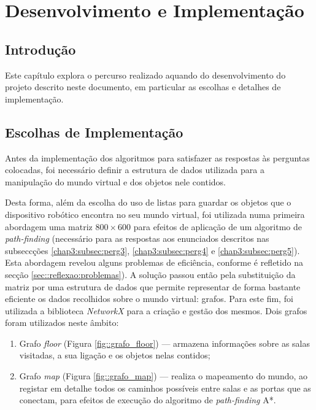 \chapter{Desenvolvimento e Implementação}
\label{ch::implement}

\section{Introdução}
\label{sec::implement:intro}

Este capítulo explora o percurso realizado aquando do desenvolvimento do projeto descrito neste documento, em particular as escolhas e detalhes de implementação.


\section{Escolhas de Implementação}
\label{sec::implement:struct}

Antes da implementação dos algoritmos para satisfazer as respostas às perguntas colocadas, foi necessário definir a estrutura de dados utilizada para a manipulação do mundo virtual e dos objetos nele contidos.

Desta forma, além da escolha do uso de listas para guardar os objetos que o dispositivo robótico encontra no seu mundo virtual, foi utilizada numa primeira abordagem uma matriz $800\times600$ para efeitos de aplicação de um algoritmo de \textit{path-finding} (necessário para as respostas aos enunciados descritos nas subseccções \ref{chap3:subsec:perg3}, \ref{chap3:subsec:perg4} e \ref{chap3:subsec:perg5}). Esta abordagem revelou alguns problemas de eficiência, conforme é refletido na secção \ref{sec::reflexao:problemas}). A solução passou então pela substituição da matriz por uma estrutura de dados que permite representar de forma bastante eficiente os dados recolhidos sobre o mundo virtual: grafos. Para este fim, foi utilizada a biblioteca \emph{NetworkX} \cite{NetworkX} para a criação e gestão dos mesmos. Dois grafos foram utilizados neste âmbito:

\begin{enumerate}
	\item Grafo \emph{floor} (Figura \ref{fig::grafo_floor}) --- armazena informações sobre as salas visitadas, a sua ligação e os objetos nelas contidos;
	
	\item Grafo \emph{map} (Figura \ref{fig::grafo_map}) --- realiza o mapeamento do mundo, ao registar em detalhe todos os caminhos possíveis entre salas e as portas que as conectam, para efeitos de execução do algoritmo de \textit{path-finding} A*.
\end{enumerate}

